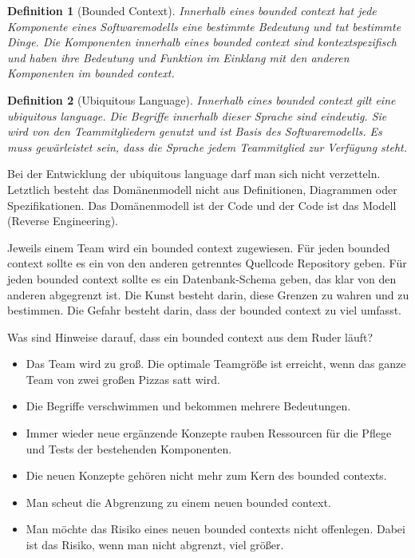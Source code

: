 \documentclass[11pt,a4paper]{scrartcl}
\newtheorem{Def}{Definition}[section]
\begin{document}
\begin{Def}[Bounded Context]
	Innerhalb eines bounded context hat jede Komponente eines Softwaremodells eine bestimmte Bedeutung und tut bestimmte Dinge. Die Komponenten innerhalb eines bounded context sind kontextspezifisch und haben ihre Bedeutung und Funktion im Einklang mit den anderen Komponenten im bounded context.
\end{Def}

\begin{Def}[Ubiquitous Language]
	Innerhalb eines bounded context gilt eine ubiquitous language. Die Begriffe innerhalb dieser Sprache sind eindeutig. Sie wird von den Teammitgliedern genutzt und ist Basis des Softwaremodells. Es muss gewärleistet sein, dass die Sprache jedem Teammitglied zur Verfügung steht.
\end{Def}

Bei der Entwicklung der ubiquitous language darf man sich nicht verzetteln. Letztlich besteht das Domänenmodell nicht aus Definitionen, Diagrammen oder Spezifikationen. Das Domänenmodell ist der Code und der Code ist das Modell (Reverse Engineering).

Jeweils einem Team wird ein bounded context zugewiesen. Für jeden bounded context sollte es ein von den anderen getrenntes Quellcode Repository geben. Für jeden bounded context sollte es ein Datenbank-Schema geben, das klar von den anderen abgegrenzt ist. Die Kunst besteht darin, diese Grenzen zu wahren und zu bestimmen. Die Gefahr besteht darin, dass der bounded context zu viel umfasst.

Was sind Hinweise darauf, dass ein bounded context aus dem Ruder läuft?
\begin{itemize}
	\item Das Team wird zu groß. Die optimale Teamgröße ist erreicht, wenn das ganze Team von zwei großen Pizzas satt wird.
	\item Die Begriffe verschwimmen und bekommen mehrere Bedeutungen.
	\item Immer wieder neue ergänzende Konzepte rauben Ressourcen für die Pflege und Tests der bestehenden Komponenten.
	\item Die neuen Konzepte gehören nicht mehr zum Kern des bounded contexts.
	\item Man scheut die Abgrenzung zu einem neuen bounded context.
	\item Man möchte das Risiko eines neuen bounded contexts nicht offenlegen. Dabei ist das Risiko, wenn man nicht abgrenzt, viel größer.
\end{itemize}
\end{document}
